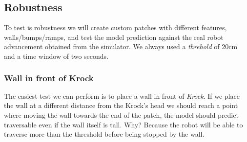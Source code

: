 \documentclass[../document.tex]{subfiles}
\begin{document}
\subsection{Robustness}
To test is robustness we will create custom patches with different features, walls/bumps/ramps, and test the model prediction against the real robot advancement obtained from the simulator. We always used a \emph{threhold} of $20$cm and a time window of two seconds. 
\subsubsection{Wall in front of Krock}
The easiest test we can perform is to place a wall in front of \emph{Krock}. If we place the wall at a different distance from the Krock's head we should reach a point where moving the wall towards the end of the patch, the model should predict traversable even if the wall itself is tall. Why? Because the robot will be able to traverse more than the threshold before being stopped by the wall.
\end{document}
